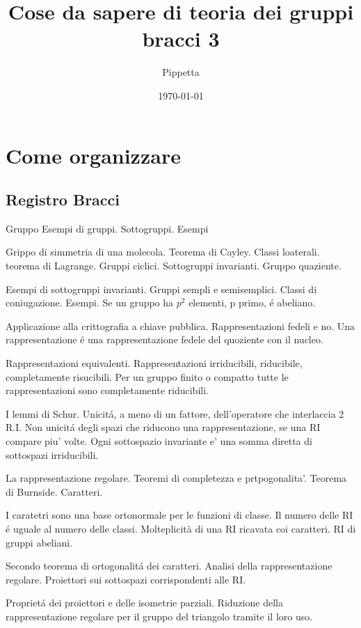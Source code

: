 \documentclass[oneside,12pt]{memoir}
\author{Pippetta}
\title{Cose da sapere di teoria dei gruppi bracci 3}
\date{\today}
\begin{document}
\frontmatter
\maketitle
\tableofcontents*
\listoffigures

\mainmatter

\part{Come organizzare}

\chapter{Registro Bracci}
\PartialToc

Gruppo Esempi di gruppi. Sottogruppi. Esempi

Grippo di simmetria di una molecola. Teorema di Cayley. Classi loaterali. teorema di Lagrange. Gruppi ciclici. Sottogruppi invarianti. Gruppo quaziente.
 
 Esempi di sottogruppi invarianti. Gruppi sempli e semisemplici. Classi di coniugazione. Esempi. Se un gruppo ha $p^2$ elementi, p primo, \'e abeliano. 
 
Applicazione alla crittografia a chiave pubblica. Rappresentazioni fedeli e no. Una rappresentazione \'e una rappresentazione fedele del quoziente con il nucleo. 

Rappresentazioni equivalenti. Rappresentazioni irriducibili, riducibile, completamente risucibili. Per un gruppo finito o compatto tutte le rappresentazioni sono completamente riducibili.

I lemmi di Schur. Unicit\'a, a meno di un fattore, dell'operatore che interlaccia 2 R.I. Non unicit\'a degli spazi che riducono una rappresentazione, se una RI compare piu' volte. Ogni sottospazio invariante e' una somma diretta di sottospazi irriducibili.

La rappresentazione regolare. Teoremi di completezza e prtpogonalita'. Teorema di Burnside. Caratteri.

I caratetri sono una base ortonormale per le funzioni di classe. Il numero delle RI \'e uguale al numero delle classi. Molteplicit\`a di una RI ricavata coi caratteri. RI di gruppi abeliani.

Secondo teorema di ortogonalit\'a dei caratteri. Analisi della rappresentazione regolare. Proiettori sui sottospazi corrispondenti alle RI.

Propriet\'a dei proiettori e delle isometrie parziali. Riduzione della rappresentazione regolare per il gruppo del triangolo tramite il loro uso.
\end{document}
